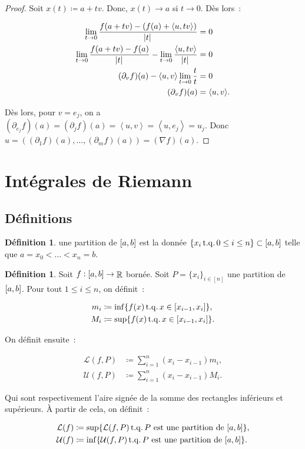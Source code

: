 \documentclass{article}
\DeclareMathOperator{\R}{\mathbb R}
\DeclareMathOperator{\tq}{ t.q. }
\newcommand{\scpr}[2]{{\left\langle#1, #2\right\rangle}}
\newcommand{\ab}{\interval ab}
\newcommand{\fabr}[1]{#1 : \ab \to \R}
\theoremstyle{definition}
\newtheorem{déf}[thm]{Définition}
\theoremstyle{remark}
\begin{document}
		\begin{proof} Soit $x(t) \coloneqq a + tv$. Donc, $x(t) \to a$ si $t \to 0$. Dès lors~:

		\begin{align*}
			\lim_{t \to 0} \frac {f(a+tv)-(f(a) + \scpr u{tv})}{\abs t} &= 0 \\
			\lim_{t \to 0} \frac {f(a+tv)-f(a)}{\abs t} - \lim_{t \to 0}\frac {\scpr u{tv}}{\abs t} &= 0 \\
			(\partial_v f)(a) - \scpr uv \lim_{t \to 0}\frac tt &= 0 \\
			(\partial_v f)(a) &= \scpr uv.
		\end{align*}

		Dès lors, pour $v = e_j$, on a $(\partial_{e_j} f)(a) = (\partial_j f)(a) = \scpr uv = \scpr u{e_j} = u_j$. Donc
		$u = ((\partial_1 f)(a), \ldots, (\partial_m f)(a)) = (\nabla f)(a)$. \end{proof}

\newpage
\section{Intégrales de Riemann}
		\subsection{Définitions}
	
		\begin{déf} une partition de $\ab$ est la donnée $\{x_i \tq 0 \leq i \leq n\} \subset \ab$ telle que $a = x_0 < \ldots < x_n = b$. \end{déf}

		\begin{déf} Soit $\fabr f$ bornée. Soit $P = \{x_i\}_{i \in [n]}$  une partition de $\ab$. Pour tout $1 \leq i \leq n$, on définit~:

		\begin{align*}
			m_i &\coloneqq \inf \{f(x) \tq x \in \interval {x_{i-1}}{x_i}\}, \\
			M_i &\coloneqq \sup \{f(x) \tq x \in \interval {x_{i-1}}{x_i}\}.
		\end{align*}

		On définit ensuite~:
	
		\begin{align*}
			\mathcal L(f, P) &\coloneqq \sum_{i=1}^n(x_i-x_{i-1})m_i, \\
			\mathcal U(f, P) &\coloneqq \sum_{i=1}^n(x_i-x_{i-1})M_i.
		\end{align*}

		Qui sont respectivement l'aire signée de la somme des rectangles inférieurs et supérieurs. À partir de cela, on définit~:
	
		\begin{align*}
			\mathcal L(f) &\coloneqq \sup \{\mathcal L(f, P) \tq P \text{ est une partition de } \ab\}, \\
			\mathcal U(f) &\coloneqq \inf \{\mathcal U(f, P) \tq P \text{ est une partition de } \ab\}.
		\end{align*}
		\end{déf}
\end{document}
